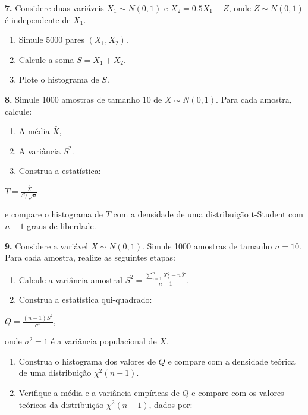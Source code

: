 \documentclass[
]{book}
\begin{document}
\textbf{7.} Considere duas variáveis \(X_1 \sim N(0, 1)\) e \(X_2 = 0.5X_1 + Z\), onde \(Z \sim N(0, 1)\) é independente de \(X_1\).

\begin{enumerate}
\def\labelenumi{(\alph{enumi})}
\item
  Simule 5000 pares \((X_1, X_2)\).
\item
  Calcule a soma \(S = X_1 + X_2\).
\item
  Plote o histograma de \(S\).
\end{enumerate}

\textbf{8.} Simule 1000 amostras de tamanho 10 de \(X \sim N(0, 1)\). Para cada amostra, calcule:

\begin{enumerate}
\def\labelenumi{(\alph{enumi})}
\item
  A média \(\bar{X}\),
\item
  A variância \(S^2\).
\item
  Construa a estatística:
\end{enumerate}

\(T = \frac{\bar{X}}{S / \sqrt{n}}\)

e compare o histograma de \(T\) com a densidade de uma distribuição t-Student com \(n-1\) graus de liberdade.

\textbf{9.} Considere a variável \(X \sim N(0, 1)\). Simule 1000 amostras de tamanho \(n = 10\). Para cada amostra, realize as seguintes etapas:

\begin{enumerate}
\def\labelenumi{(\alph{enumi})}
\item
  Calcule a variância amostral \(S^2 = \frac{\sum_{i=1}^{n}X_{i}^{2}-n \bar{X}}{n-1}\).
\item
  Construa a estatística qui-quadrado:
\end{enumerate}

\(Q = \frac{(n-1) S^2}{\sigma^2}\),

onde \(\sigma^2 = 1\) é a variância populacional de \(X\).

\begin{enumerate}
\def\labelenumi{(\alph{enumi})}
\setcounter{enumi}{2}
\item
  Construa o histograma dos valores de \(Q\) e compare com a densidade teórica de uma distribuição \(\chi^2(n-1)\).
\item
  Verifique a média e a variância empíricas de \(Q\) e compare com os valores teóricos da distribuição \(\chi^2(n-1)\), dados por:
\end{enumerate}
\end{document}
